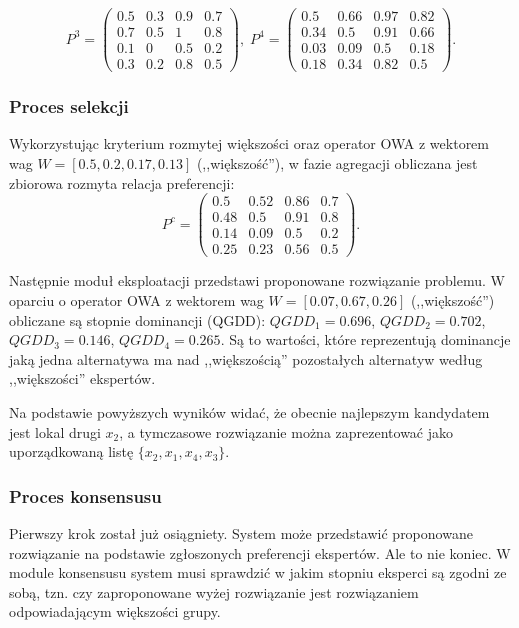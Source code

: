 $$
P^3 = 
\begin{pmatrix}
0.5  & 0.3   & 0.9   & 0.7  \\
0.7  & 0.5   & 1     & 0.8  \\
0.1  & 0     & 0.5   & 0.2  \\
0.3  & 0.2   & 0.8   & 0.5
\end{pmatrix},\;
P^4 = 
\begin{pmatrix}
0.5  & 0.66  & 0.97  & 0.82 \\
0.34 & 0.5   & 0.91  & 0.66 \\
0.03 & 0.09  & 0.5   & 0.18 \\
0.18 & 0.34  & 0.82  & 0.5
\end{pmatrix}.
$$
  
\subsubsection{Proces selekcji}
Wykorzystując kryterium rozmytej większości oraz operator OWA z wektorem wag
$W= [0.5,0.2,0.17,0.13]$ (,,większość''), w fazie agregacji obliczana jest
zbiorowa rozmyta relacja preferencji:
$$
P^c = 
\begin{pmatrix}
0.5  & 0.52  & 0.86   & 0.7  \\
0.48 & 0.5   & 0.91   & 0.8  \\
0.14 & 0.09  & 0.5    & 0.2  \\
0.25 & 0.23  & 0.56   & 0.5
\end{pmatrix}.
$$

Następnie moduł eksploatacji przedstawi proponowane rozwiązanie problemu. 
W oparciu o operator OWA z wektorem wag $W = [0.07, 0.67, 0.26]$
(,,większość'') obliczane są stopnie dominancji (QGDD): $QGDD_1 = 0.696$,
$QGDD_2 = 0.702$, $QGDD_3 = 0.146$, $QGDD_4 = 0.265$. Są to wartości, które
reprezentują dominancje jaką jedna alternatywa ma nad ,,większością''
pozostałych alternatyw według ,,większości'' ekspertów.

Na podstawie powyższych wyników widać, że obecnie najlepszym kandydatem jest
lokal drugi $x_2$, a tymczasowe rozwiązanie można zaprezentować jako
uporządkowaną listę $\{ x_2, x_1,x_4, x_3\}$.

\subsubsection{Proces konsensusu}
Pierwszy krok został już osiągniety. System może przedstawić proponowane
rozwiązanie na podstawie zgłoszonych preferencji ekspertów. Ale to nie koniec. W
module konsensusu system musi sprawdzić w jakim stopniu eksperci są zgodni ze
sobą, tzn. czy zaproponowane wyżej rozwiązanie jest rozwiązaniem odpowiadającym
większości grupy.

